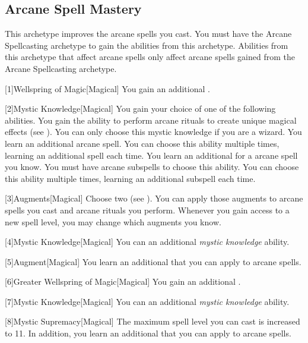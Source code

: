     \subsection{Arcane Spell Mastery}
        This archetype improves the arcane spells you cast.
        You must have the Arcane Spellcasting archetype to gain the abilities from this archetype.
        Abilities from this archetype that affect arcane spells only affect arcane spells gained from the Arcane Spellcasting archetype.

        [1]{Wellspring of Magic}[Magical]
        You gain an additional .

        [2]{Mystic Knowledge}[Magical]
        You gain your choice of one of the following abilities.
        {
             You gain the ability to perform arcane rituals to create unique magical effects (see ).
                You can only choose this mystic knowledge if you are a wizard.
             You learn an additional arcane spell.
                You can choose this ability multiple times, learning an additional spell each time.
             You learn an additional  for a arcane spell you know.
                You must have arcane subspells to choose this ability.
                You can choose this ability multiple times, learning an additional subspell each time.
        }

        [3]{Augments}[Magical]
        Choose two  (see ).
        You can apply those augments to arcane spells you cast and arcane rituals you perform.
        Whenever you gain access to a new spell level, you may change which augments you know.

        [4]{Mystic Knowledge}[Magical]
        You can an additional \textit{mystic knowledge} ability.

        [5]{Augment}[Magical]
        You learn an additional  that you can apply to arcane spells.

        [6]{Greater Wellspring of Magic}[Magical]
        You gain an additional .

        [7]{Mystic Knowledge}[Magical]
        You can an additional \textit{mystic knowledge} ability.

        [8]{Mystic Supremacy}[Magical]
        The maximum spell level you can cast is increased to 11.
        In addition, you learn an additional  that you can apply to arcane spells.

